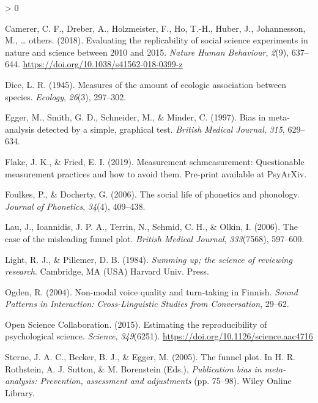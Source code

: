 \documentclass[
  english,
  man]{apa6}
\newlength{\cslhangindent}
\newenvironment{CSLReferences}[2] %
 {%
  \setlength{\parindent}{0pt}
  \ifodd #1 \everypar{\setlength{\hangindent}{\cslhangindent}}\ignorespaces\fi
  \ifnum #2 > 0
  \setlength{\parskip}{#2\baselineskip}
  \fi
 }%
 {}
\begin{document}
\hypertarget{refs}{}
\begin{CSLReferences}{1}{0}
\leavevmode\hypertarget{ref-camerer2018evaluating}{}%
Camerer, C. F., Dreber, A., Holzmeister, F., Ho, T.-H., Huber, J., Johannesson, M., \ldots{} others. (2018). Evaluating the replicability of social science experiments in nature and science between 2010 and 2015. \emph{Nature Human Behaviour}, \emph{2}(9), 637--644. \url{https://doi.org/10.1038/s41562-018-0399-z}

\leavevmode\hypertarget{ref-dice1945}{}%
Dice, L. R. (1945). Measures of the amount of ecologic association between species. \emph{Ecology}, \emph{26}(3), 297--302.

\leavevmode\hypertarget{ref-egger1997}{}%
Egger, M., Smith, G. D., Schneider, M., \& Minder, C. (1997). Bias in meta-analysis detected by a simple, graphical test. \emph{British Medical Journal}, \emph{315}, 629--634.

\leavevmode\hypertarget{ref-flake2019}{}%
Flake, J. K., \& Fried, E. I. (2019). Measurement schmeasurement: Questionable measurement practices and how to avoid them. Pre-print available at PsyArXiv.

\leavevmode\hypertarget{ref-foulkes2006}{}%
Foulkes, P., \& Docherty, G. (2006). The social life of phonetics and phonology. \emph{Journal of Phonetics}, \emph{34}(4), 409--438.

\leavevmode\hypertarget{ref-lau2006}{}%
Lau, J., Ioannidis, J. P. A., Terrin, N., Schmid, C. H., \& Olkin, I. (2006). The case of the misleading funnel plot. \emph{British Medical Journal}, \emph{333}(7568), 597--600.

\leavevmode\hypertarget{ref-light1984}{}%
Light, R. J., \& Pillemer, D. B. (1984). \emph{Summing up; the science of reviewing research}. Cambridge, MA (USA) Harvard Univ. Press.

\leavevmode\hypertarget{ref-ogden2004}{}%
Ogden, R. (2004). Non-modal voice quality and turn-taking in {F}innish. \emph{Sound Patterns in Interaction: Cross-Linguistic Studies from Conversation}, 29--62.

\leavevmode\hypertarget{ref-open2015estimating}{}%
Open Science Collaboration. (2015). Estimating the reproducibility of psychological science. \emph{Science}, \emph{349}(6251). \url{https://doi.org/10.1126/science.aac4716}

\leavevmode\hypertarget{ref-sterne2005}{}%
Sterne, J. A. C., Becker, B. J., \& Egger, M. (2005). The funnel plot. In H. R. Rothstein, A. J. Sutton, \& M. Borenstein (Eds.), \emph{Publication bias in meta-analysis: Prevention, assessment and adjustments} (pp. 75--98). Wiley Online Library.


\end{CSLReferences}
\end{document}

